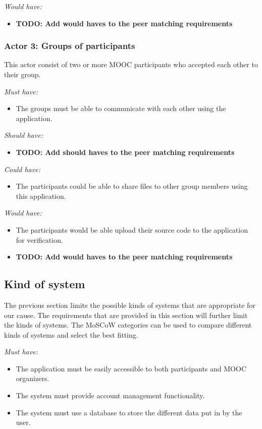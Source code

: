 \documentclass[]{article}
\newcommand{\TODO}[1]{{\color{red}\textbf{TODO: #1}}}
\newcommand{\reqr}[1]{{\noindent\emph{#1:}}}
\begin{document}
\reqr{Would have}
\begin{itemize}
\item \TODO{Add would haves to the peer matching requirements}
\end{itemize}


\subsubsection{Actor 3: Groups of participants}
This actor consist of two or more MOOC participants who accepted each other to their group.

\reqr{Must have}
\begin{itemize}
\item The groups must be able to communicate with each other using the application.
\end{itemize}

\reqr{Should have}
\begin{itemize}
\item \TODO{Add should haves to the peer matching requirements}
\end{itemize}

\reqr{Could have}
\begin{itemize}
\item The participants could be able to share files to other group members using this application.
\end{itemize}

\reqr{Would have}
\begin{itemize}
\item The participants would be able upload their source code to the application for verification.
\item \TODO{Add would haves to the peer matching requirements}
\end{itemize}

\subsection{Kind of system}
The previous section limits the possible kinds of systems that are appropriate for our cause.
The requirements that are provided in this section will further limit the kinds of systems.
The MoSCoW categories can be used to compare different kinds of systems and select the best fitting.

\reqr{Must have}
\begin{itemize}
\item The application must be easily accessible to both participants and MOOC organizers.
\item The system must provide account management functionality.
\item The system must use a database to store the different data put in by the user.
\end{itemize}
\end{document}
